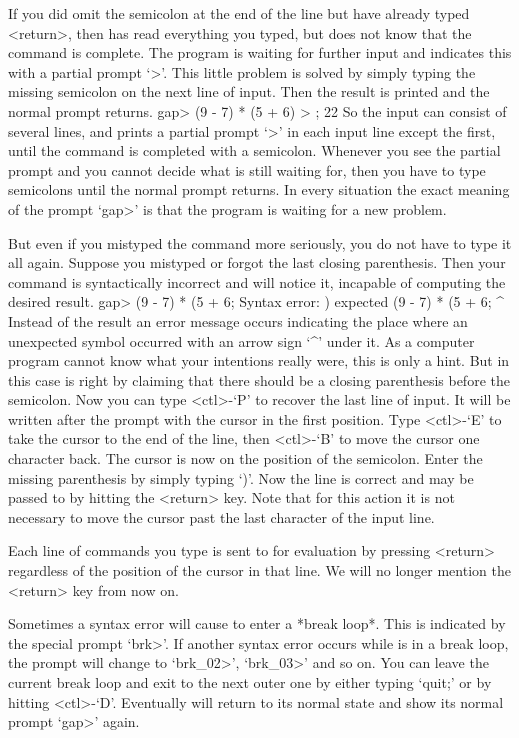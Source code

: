 If you did omit the semicolon at the end of the line but have already
typed <return>, then {\GAP} has read everything you typed,
but does not know that the command is complete.
The program is waiting for further input
and indicates this with a partial prompt `>'.
This little  problem is solved by simply  typing the missing semicolon on
the next line of input. Then the result is  printed and the normal prompt
returns.
\beginexample
gap> (9 - 7) * (5 + 6)
> ;
22 
\endexample
So the input can consist of several lines, and {\GAP} prints a partial
prompt `>' in each input line except the first, until the command is
completed with a semicolon.
Whenever you see the partial prompt and you cannot decide what {\GAP} is
still  waiting for, then  you have  to type  semicolons  until the normal
prompt returns.
In  every situation the exact meaning of the prompt `gap>' is that the
program is waiting for a new problem.

But even if you  mistyped the command more  seriously, you do not have to
type   it all again. Suppose   you  mistyped or  forgot  the last closing
parenthesis. Then your command is syntactically incorrect and {\GAP} will
notice it, incapable of computing the desired result.
\begintt
gap> (9 - 7) * (5 + 6;
Syntax error: ) expected
(9 - 7) * (5 + 6;
                ^
\endtt
{}%
Instead of the result an error message  occurs indicating the place where
an unexpected  symbol occurred with   an arrow sign  `^'  under it.  As a
computer program  cannot know what your  intentions really were,  this is
only  a hint. But in this  case {\GAP}  is  right by  claiming that there
should be a closing  parenthesis before the  semicolon. Now you  can type
<ctl>-`P' to recover the last line of input. It will be written after the
prompt with the cursor in the first  position. Type <ctl>-`E' to take the
cursor  to the end of   the line, then <ctl>-`B'   to move the cursor one
character back. The cursor is now on the position of the semicolon. Enter
the missing parenthesis by simply typing `)'. Now the line is correct and
may be passed to {\GAP}  by hitting the <return>  key. Note that for this
action it is not necessary to move the cursor  past the last character of
the input line.

Each line  of commands  you  type is sent to    {\GAP} for evaluation  by
pressing <return> regardless of the position of  the cursor in that line.
We will no longer mention the <return> key from now on.

%
Sometimes a syntax error will cause {\GAP} to enter a *break loop*.  This
is indicated by the special prompt `brk>'. If another syntax error occurs
while  {\GAP} is in  a break loop, the prompt  will  change to `brk_02>',
`brk_03>' and so on. You can leave the current break loop and exit to the
next outer one by either typing `quit;' or by hitting <ctl>-`D'.
Eventually {\GAP} will return to its normal state and show its normal
prompt `gap>' again.

